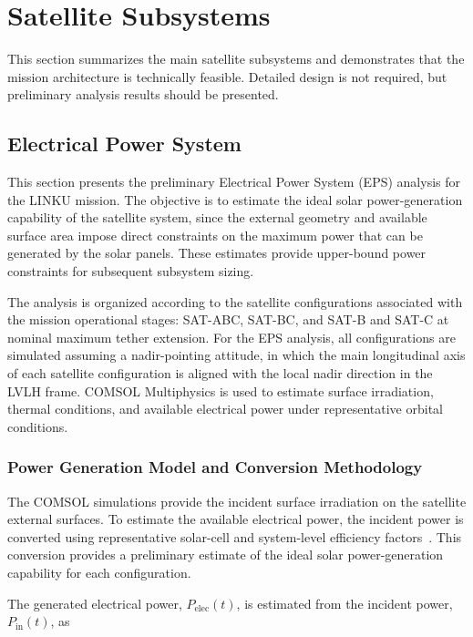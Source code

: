 \chapter{Satellite Subsystems}
\label{ch:satellite_subsystems}
This section summarizes the main satellite subsystems and demonstrates that the mission architecture is technically feasible. Detailed design is not required, but preliminary analysis results should be presented.

\section{Electrical Power System}
\label{sec:electrical_power_system}
This section presents the preliminary Electrical Power System (EPS) analysis for the LINKU mission. The objective is to estimate the ideal solar power-generation capability of the satellite system, since the external geometry and available surface area impose direct constraints on the maximum power that can be generated by the solar panels. These estimates provide upper-bound power constraints for subsequent subsystem sizing.

The analysis is organized according to the satellite configurations associated with the mission operational stages: SAT-ABC, SAT-BC, and SAT-B and SAT-C at nominal maximum tether extension. For the EPS analysis, all configurations are simulated assuming a nadir-pointing attitude, in which the main longitudinal axis of each satellite configuration is aligned with the local nadir direction in the LVLH frame. COMSOL Multiphysics is used to estimate surface irradiation, thermal conditions, and available electrical power under representative orbital conditions.

\subsection{Power Generation Model and Conversion Methodology}
\label{sub:eps_power_generation_model}
The COMSOL simulations provide the incident surface irradiation on the satellite external surfaces. To estimate the available electrical power, the incident power is converted using representative solar-cell and system-level efficiency factors~\cite{Wertz2011SMAD, Solomon2025Electrical}. This conversion provides a preliminary estimate of the ideal solar power-generation capability for each configuration.

The generated electrical power, \(P_{\mathrm{elec}}(t)\), is estimated from the incident power, \(P_{\mathrm{in}}(t)\), as

